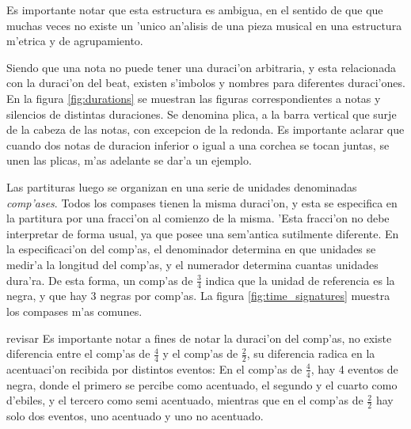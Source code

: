 Es importante notar que esta estructura es ambigua, en el sentido de que que muchas veces no existe un 'unico an'alisis de una pieza musical 
en una estructura m'etrica y de agrupamiento.


Siendo que una nota no puede tener una duraci'on arbitraria, y esta relacionada con la duraci'on del beat, existen s'imbolos y nombres para diferentes duraci'ones. 
En la figura \ref{fig:durations} se muestran las figuras correspondientes a notas y silencios de distintas duraciones. Se denomina plica, a la barra vertical que surje 
de la cabeza de las notas, con excepcion de la redonda. Es importante aclarar que cuando dos notas de duracion inferior o igual a una corchea se tocan juntas, 
se unen las plicas, m'as adelante se dar'a un ejemplo.

\begin{imagen}
    \width{12cm}
\end{imagen}

Las partituras luego se organizan en una serie de unidades denominadas \emph{comp'ases}. Todos los compases tienen la misma duraci'on, y esta se especifica
en la partitura por una fracci'on al comienzo de la misma. 'Esta fracci'on no debe interpretar de forma usual, ya que posee una sem'antica sutilmente diferente.
En la especificaci'on del comp'as, el denominador determina en que unidades se medir'a la longitud del comp'as, y el numerador determina cuantas unidades dura'ra.
De esta forma, un comp'as de $\frac{3}{4}$ indica que la unidad de referencia es la negra, y que hay $3$ negras por comp'as.
La figura \ref{fig:time_signatures} muestra los compases m'as comunes. 

\begin{imagen}
    \width{5cm}
\end{imagen}

\alert{revisar}
Es importante notar a fines de notar la duraci'on del comp'as, no existe diferencia entre el comp'as de $\frac{4}{4}$ y el comp'as de $\frac{2}{2}$, su diferencia
radica en la acentuaci'on recibida por distintos eventos: En el comp'as de $\frac{4}{4}$, hay 4 eventos de negra, donde el primero se percibe como acentuado, 
el segundo y el cuarto como d'ebiles, y el tercero como semi acentuado, mientras que en el comp'as de $\frac{2}{2}$ hay solo dos eventos, uno acentuado y uno no 
acentuado. 

